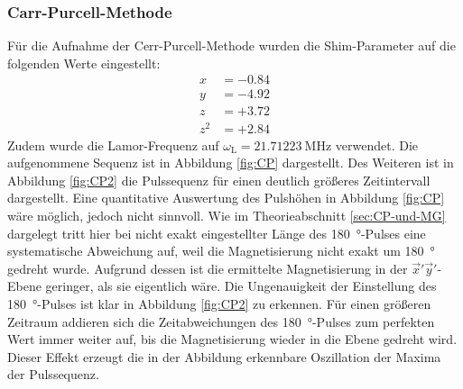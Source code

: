 \subsubsection{Carr-Purcell-Methode}
Für die Aufnahme der Cerr-Purcell-Methode wurden die Shim-Parameter auf die
folgenden Werte eingestellt:
\begin{align*}
  x &= -\num{0.84} \\
  y &= -\num{4.92} \\
  z &= +\num{3.72} \\
  z^2 &= +\num{2.84}
\end{align*}
Zudem wurde die Lamor-Frequenz auf $\omega_\text{L} = \SI{21.71223}{\mega\hertz}$
verwendet. Die aufgenommene Sequenz ist in Abbildung \ref{fig:CP} dargestellt.
Des Weiteren ist in Abbildung \ref{fig:CP2} die Pulssequenz für einen
deutlich größeres Zeitintervall dargestellt.
Eine quantitative Auswertung des Pulshöhen in Abbildung \ref{fig:CP} wäre möglich,
jedoch nicht sinnvoll.
Wie im Theorieabschnitt \ref{sec:CP-und-MG} dargelegt tritt hier bei nicht
exakt eingestellter Länge des \SI{180}{\degree}-Pulses eine systematische
Abweichung auf, weil die Magnetisierung nicht exakt um \SI{180}{\degree}
gedreht wurde.
Aufgrund dessen ist die ermittelte Magnetisierung in der $\vec{x}'\vec{y}'$-Ebene
geringer, als sie eigentlich wäre.
Die Ungenauigkeit der Einstellung des \SI{180}{\degree}-Pulses ist klar in
Abbildung \ref{fig:CP2} zu erkennen.
Für einen größeren Zeitraum addieren sich die Zeitabweichungen des \SI{180}{\degree}-Pulses
zum perfekten Wert immer weiter auf, bis die Magnetisierung wieder in die
Ebene gedreht wird.
Dieser Effekt erzeugt die in der Abbildung erkennbare Oszillation der
Maxima der Pulssequenz.
\FloatBarrier


